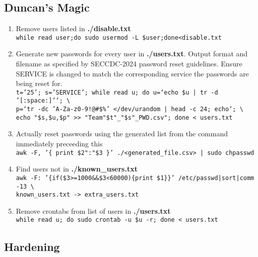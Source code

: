\documentclass[12pt,letterpaper]{article}
\def\code#1{\textcolor{iris}{\texttt{#1}}}
\def\bf#1{\textbf{#1}}
\begin{document}
\subsection{Duncan's Magic}
\label{subsec:dmagic}

\begin{enumerate}
	\item Remove users listed in \bf{./disable.txt} \\
		\code{while read user;do sudo usermod -L \$user;done<disable.txt}
	\item Generate new passwords for every user in \bf{./users.txt}. Output format and filename as specified by SECCDC-2024 password reset guidelines. Ensure SERVICE is changed to match the corresponding service the passwords are being reset for. \\
		\code{t='25'; s='SERVICE'; while read u; do u=`echo \$u | tr -d '[:space:]'`; \textbackslash\\
		p=`tr -dc 'A-Za-z0-9!@\#\$\%' </dev/urandom | head -c 24; echo`; \textbackslash\\
		echo "\$s,\$u,\$p" >{}> "Team"\$t"\_"\$s"\_PWD.csv"; done < users.txt}
	\item Actually reset passwords using the generated list from the command immediately preceeding this \\
		\code{awk -F, '\{ print \$2":"\$3 \}' ./<generated\_file.csv> | sudo chpasswd}
	\item Find users not in \bf{./known\_users.txt} \\
		\code{awk -F: '\{if(\$3>{}=1000\&\&\$3<60000)\{print \$1\}\}' /etc/passwd|sort|comm -13 \textbackslash \\
		known\_users.txt -> extra\_users.txt}
	\item Remove crontabs from list of users in \bf{./users.txt} \\
		\code{while read u; do sudo crontab -u \$u -r; done < users.txt}
\end{enumerate}

\subsection{Hardening}
\end{document}
